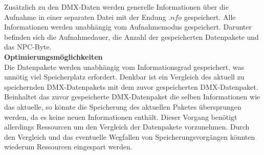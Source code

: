 Zusätzlich zu den DMX-Daten werden generelle Informationen über die Aufnahme in einer separaten Datei mit der Endung $.nfo$ gespeichert. Alle Informationen werden unabhängig vom Aufnahmemodus gespeichert. Darunter befinden sich die Aufnahmedauer, die Anzahl der gespeicherten Datenpakete und das NPC-Byte.\\
\newline
\textbf{Optimierungsmöglichkeiten}\\
Die Datenpakete werden unabhängig vom Informationsgrad gespeichert, was unnötig viel Speicherplatz erfordert. Denkbar ist ein Vergleich des aktuell zu speichernden DMX-Datenpakets mit dem zuvor gespeicherten DMX-Datenpaket. Beinhaltet das zuvor gespeicherte DMX-Datenpaket die selben Informationen wie das aktuelle, so könnte die Speicherung des aktuellen Paketes übersprungen werden, da es keine neuen Informationen enthält. Dieser Vorgang benötigt allerdings Ressourcen um den Vergleich der Datenpakete vorzunehmen. Durch den Vergleich und das eventuelle Wegfallen von Speicherungsvorgängen könnten wiederum Ressourcen eingespart werden.